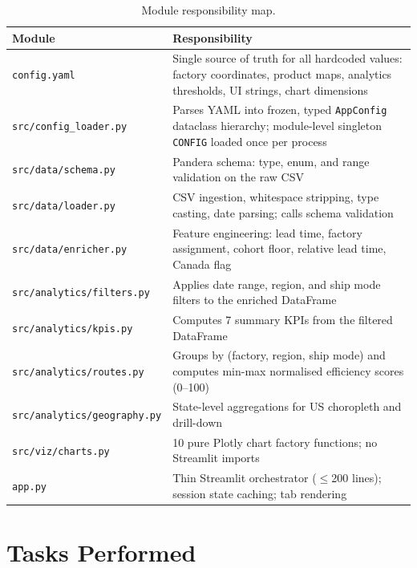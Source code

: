 \documentclass[12pt, a4paper]{report}
\begin{document}
\begin{table}[H]
  \centering
  \caption{Module responsibility map.}
  \label{tab:modules}
  \begin{tabularx}{\textwidth}{@{} L{0.36\textwidth} X @{}}
    \toprule
    \textbf{Module} & \textbf{Responsibility} \\
    \midrule
    \texttt{config.yaml}            & Single source of truth for all hardcoded values: factory coordinates, product maps, analytics thresholds, UI strings, chart dimensions \\[4pt]
    \texttt{src/config\_loader.py}  & Parses YAML into frozen, typed \texttt{AppConfig} dataclass hierarchy; module-level singleton \texttt{CONFIG} loaded once per process \\[4pt]
    \texttt{src/data/schema.py}     & Pandera schema: type, enum, and range validation on the raw CSV \\[4pt]
    \texttt{src/data/loader.py}     & CSV ingestion, whitespace stripping, type casting, date parsing; calls schema validation \\[4pt]
    \texttt{src/data/enricher.py}   & Feature engineering: lead time, factory assignment, cohort floor, relative lead time, Canada flag \\[4pt]
    \texttt{src/analytics/filters.py} & Applies date range, region, and ship mode filters to the enriched DataFrame \\[4pt]
    \texttt{src/analytics/kpis.py}  & Computes 7 summary KPIs from the filtered DataFrame \\[4pt]
    \texttt{src/analytics/routes.py} & Groups by (factory, region, ship mode) and computes min-max normalised efficiency scores (0--100) \\[4pt]
    \texttt{src/analytics/geography.py} & State-level aggregations for US choropleth and drill-down \\[4pt]
    \texttt{src/viz/charts.py}      & 10 pure Plotly chart factory functions; no Streamlit imports \\[4pt]
    \texttt{app.py}                 & Thin Streamlit orchestrator ($\leq$200 lines); session state caching; tab rendering \\
    \bottomrule
  \end{tabularx}
\end{table}

\chapter{Tasks Performed}
\end{document}
